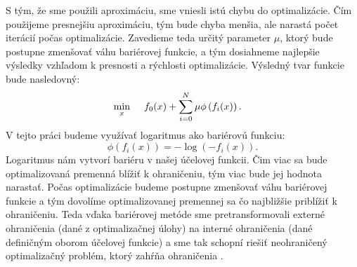 S tým, že sme použili aproximáciu, sme vniesli istú chybu do optimalizácie. Čím použijeme presnejšiu aproximáciu, tým bude chyba menšia, ale narastá počet iterácií počas optimalizácie. Zavedieme teda určitý parameter $\mu$, ktorý bude postupne zmenšovať váhu bariérovej funkcie, a tým dosiahneme najlepšie výsledky vzhľadom k presnosti a rýchlosti optimalizácie. Výsledný tvar funkcie bude nasledovný:
\begin{align}
\displaystyle \min_{x} \hspace{0.5cm} & 
f_{0}(x) + \sum_{i=0}^{N}\mu\phi\left(f_{i}(x)\right).
\end{align}
V tejto práci budeme využívať logaritmus ako bariérovú funkciu:
\begin{equation}
	\phi\left(f_{i}(x)\right) = -\log(-f_{i}(x)).
\end{equation}
Logaritmus nám vytvorí bariéru v našej účelovej funkcii. Čim viac sa bude optimalizovaná premenná blížiť k ohraničeniu, tým viac bude jej hodnota narastať. Počas optimalizácie budeme postupne zmenšovať váhu bariérovej funkcie a tým dovolíme optimalizovanej premennej sa čo najbližšie priblížiť k ohraničeniu. Teda vďaka bariérovej metóde sme pretransformovali externé ohraničenia (dané z optimalizačnej úlohy) na interné ohraničenia (dané definičným oborom účelovej funkcie) a sme tak schopní riešiť neohraničený optimalizačný problém, ktorý zahŕňa ohraničenia \cite{bib12}. 